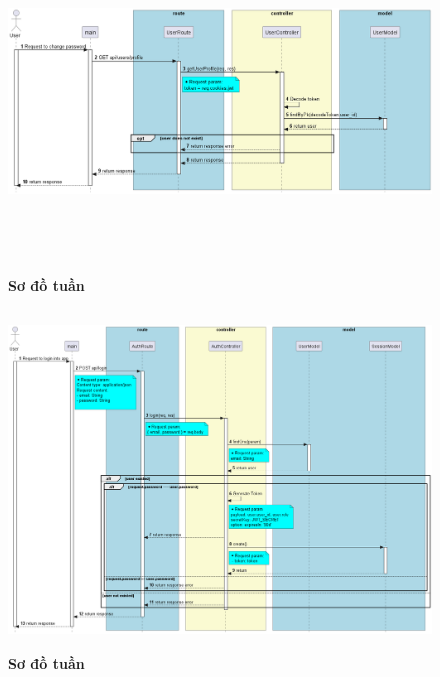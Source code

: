 \documentclass{article}%
\begin{document}
\begin{figure}[H]
  \centering
  \includegraphics[width=16cm,height=9cm]{Images/server/sequence/server/getUserProfile.png}
  \caption[Sơ đồ tuần tự ]{\bfseries \fontsize{12pt}{0pt}
  \selectfont Sơ đồ tuần }
  \label{hinh21} %
\end{figure}

\begin{figure}[H]
  \centering
  \includegraphics[width=16cm,height=9cm]{Images/server/sequence/server/login.png}
  \caption[Sơ đồ tuần tự ]{\bfseries \fontsize{12pt}{0pt}
  \selectfont Sơ đồ tuần }
  \label{hinh21} %
\end{figure}
\end{document}
